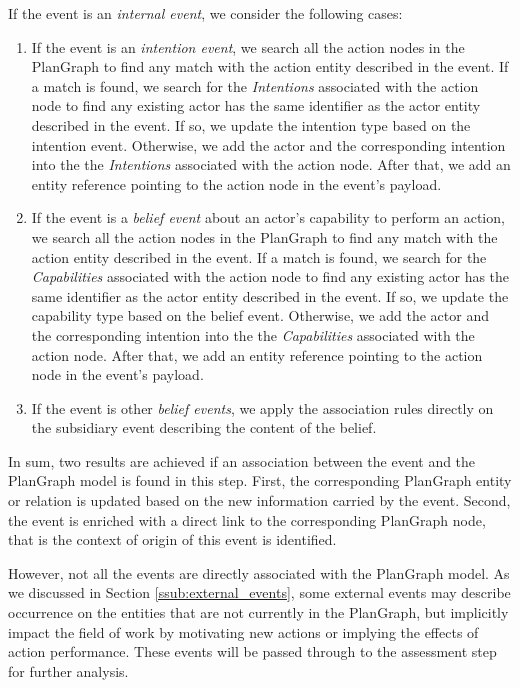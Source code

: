 If the event is an \emph{internal event}, we consider the following cases:
\begin{enumerate}
	\item If the event is an \emph{intention event}, we search all the action nodes in the PlanGraph to find any match with the action entity described in the event. If a match is found, we search for the \emph{Intentions} associated with the action node to find any existing actor has the same identifier as the actor entity described in the event. If so, we update the intention type based on the intention event. Otherwise, we add the actor and the corresponding intention into the the \emph{Intentions} associated with the action node. After that, we add an entity reference pointing to the action node in the event's payload. 
	\item If the event is a \emph{belief event} about an actor's capability to perform an action, we search all the action nodes in the PlanGraph to find any match with the action entity described in the event. If a match is found, we search for the \emph{Capabilities} associated with the action node to find any existing actor has the same identifier as the actor entity described in the event. If so, we update the capability type based on the belief event. Otherwise, we add the actor and the corresponding intention into the the \emph{Capabilities} associated with the action node. After that, we add an entity reference pointing to the action node in the event's payload. 
	\item If the event is other \emph{belief events}, we apply the association rules directly on the subsidiary event describing the content of the belief. 
\end{enumerate}

In sum, two results are achieved if an association between the event and the PlanGraph model is found in this step. First, the corresponding PlanGraph entity or relation is updated based on the new information carried by the event. Second, the event is enriched with a direct link to the corresponding PlanGraph node, that is the context of origin of this event is identified. 

However, not all the events are directly associated with the PlanGraph model. As we discussed in Section \ref{ssub:external_events}, some external events may describe occurrence on the entities that are not currently in the PlanGraph, but implicitly impact the field of work by motivating new actions or implying the effects of action performance. These events will be passed through to the assessment step for further analysis. 

